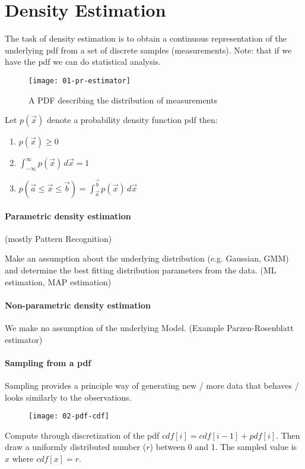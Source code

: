
\section*{Density Estimation}
The task of density estimation is to obtain a continuous representation of the underlying pdf from a set of discrete samples (measurements). Note: that if we have the pdf we can do statistical analysis.

\begin{figure}[H]
  \centering
  \texttt{[image: 01-pr-estimator]}
  \caption{A PDF describing the distribution of measurements}
\end{figure}

Let $p(\vec{x})$ denote a probability density function pdf then:

\begin{enumerate}
  \item $p(\vec{x}) \ge 0$
  \item $\int_{-\infty}^\infty p(\vec{x}) \,d\vec{x} = 1$
  \item $p(\vec{a} \le \vec{x} \le \vec{b}) = \int_{\vec{a}}^{\vec{b}} p(\vec{x}) \,d\vec{x}$
\end{enumerate}

\paragraph{Parametric density estimation}
(mostly Pattern Recognition)

Make an assumption about the underlying distribution (e.g. Gaussian, GMM) and determine the best fitting distribution parameters from the data. (ML estimation, MAP estimation)

\paragraph{Non-parametric density estimation}

We make no assumption of the underlying Model. (Example Parzen-Rosenblatt estimator)

\paragraph{Sampling from a pdf}
Sampling provides a principle way of generating new / more data that behaves / looks similarly to the observations.

\begin{figure}[H]
  \centering
  \texttt{[image: 02-pdf-cdf]}
\end{figure}

Compute through discretization of the pdf $cdf[i] = cdf[i-1] + pdf[i]$. Then draw a uniformly distributed number ($r$) between 0 and 1. The sampled value is $x$ where $cdf[x] = r$.

